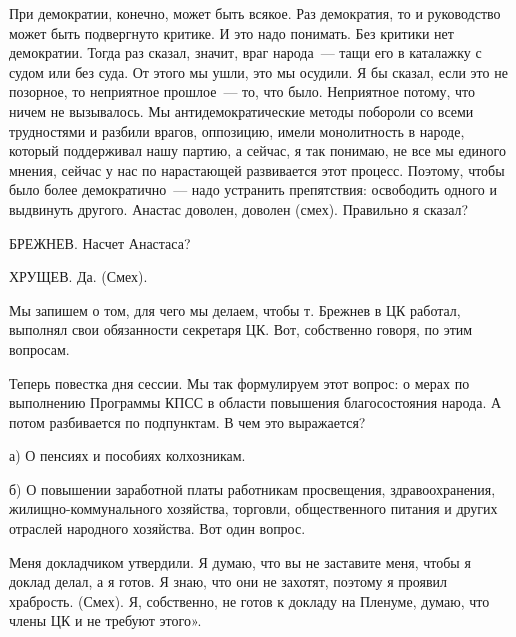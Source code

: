 \documentclass{kursa4}
\begin{document}
  {При демократии, конечно, может быть всякое. Раз
  демократия, то и руководство может быть подвергнуто критике. И это надо
  понимать. Без критики нет демократии. Тогда раз сказал, значит, враг
  народа~--- тащи его в каталажку с судом или без суда. От этого мы ушли,
  это мы осудили. Я бы сказал, если это не позорное, то неприятное
  прошлое~--- то, что было. Неприятное потому, что ничем не вызывалось. Мы
  антидемократические методы побороли со всеми трудностями и разбили
  врагов, оппозицию, имели монолитность в народе, который поддерживал
  нашу партию, а сейчас, я так понимаю, не все мы единого мнения, сейчас
  у нас по нарастающей развивается этот процесс. Поэтому, чтобы было
  более демократично~--- надо устранить препятствия: освободить одного и
  выдвинуть другого. Анастас доволен, доволен
  (}\textcolor[rgb]{0.77254903,0.0,0.043137256}{смех}{).
  Правильно я сказал?}

  \textcolor[rgb]{0.77254903,0.0,0.043137256}{БРЕЖНЕВ.}{
  Насчет Анастаса?}

  \textcolor[rgb]{0.77254903,0.0,0.043137256}{ХРУЩЕВ.}{
  Да.
  (}\textcolor[rgb]{0.77254903,0.0,0.043137256}{Смех}{).}

  {Мы запишем о том, для чего мы делаем, чтобы т. Брежнев
  в ЦК работал, выполнял свои обязанности секретаря ЦК. Вот, собственно
  говоря, по этим вопросам.}

  {Теперь повестка дня сессии. Мы так формулируем этот
  вопрос: о мерах по выполнению Программы КПСС в области повышения
  благосостояния народа. А потом разбивается по подпунктам. В чем это
  выражается?}

  {а) О пенсиях и пособиях колхозникам.}

  {б) О повышении заработной платы работникам
  просвещения, здравоохранения, жилищно-коммунального хозяйства,
  торговли, общественного питания и других отраслей народного хозяйства.
  Вот один вопрос.}

  {Меня докладчиком утвердили. Я думаю, что вы не
  заставите меня, чтобы я доклад делал, а я готов. Я знаю, что они не
  захотят, поэтому я проявил храбрость.
  (}\textcolor[rgb]{0.77254903,0.0,0.043137256}{Смех}{).
  Я, собственно, не готов к докладу на Пленуме, думаю, что члены ЦК и не
  требуют этого».}
\end{document}

